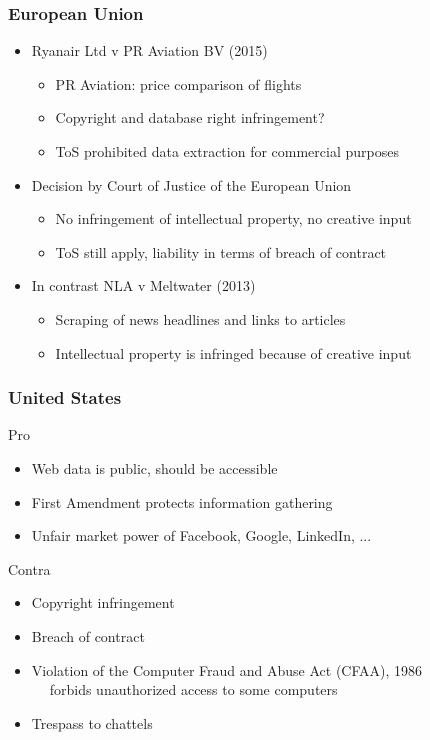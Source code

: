 \begin{frame}
    \frametitle{European Union}
    \begin{itemize}
        \item \textcolor{iseblue}{Ryanair Ltd v PR Aviation BV (2015)}
        \begin{itemize}
            \item PR Aviation: price comparison of flights
            \item Copyright and database right infringement?
            \item ToS prohibited data extraction for commercial purposes
        \end{itemize}
            \end{itemize}
        \begin{itemize}
        \item Decision by Court of Justice of the European Union
        \begin{itemize}
            \item No infringement of intellectual property, no creative input
            \item ToS still apply, liability in terms of breach of contract
        \end{itemize}
    \end{itemize}
    \vspace{5pt}
        \begin{itemize}
        \item In contrast \textcolor{iseblue}{NLA v Meltwater (2013)}
        \begin{itemize}
            \item Scraping of news headlines and links to articles
            \item Intellectual property is infringed because of creative input
        \end{itemize}
    \end{itemize}
\end{frame}

\begin{frame}
    \frametitle{United States}
Pro \\
\begin{itemize}
    \item Web data is public, should be accessible
    \item First Amendment protects information gathering
    \item Unfair market power of Facebook, Google, LinkedIn, ...
\end{itemize}
\vspace{8pt}
Contra \\
\begin{itemize}
    \item Copyright infringement
    \item Breach of contract
    \item Violation of the Computer Fraud and Abuse Act (CFAA), 1986 \\
        $\quad \;$forbids unauthorized access to some computers
    \item Trespass to chattels
\end{itemize}
\end{frame}


